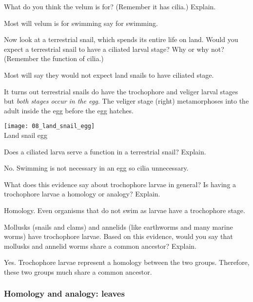 \documentclass[12pt, hidelinks]{exam}
\newcommand*\AnswerBox[2]{%
    \parbox[t][#1]{0.92\textwidth}{%
    \begin{solution}#2\end{solution}}
    \vspace{\stretch{1}}
}
\begin{document}
\begin{questions}
\question
What do you think the velum is for? (Remember it has cilia.) Explain.

\AnswerBox{4\baselineskip}{Most will velum is for swimming say for swimming.}


\question
Now look at a terrestrial snail, which spends its
entire life on land. Would you expect a terrestrial snail to
have a ciliated larval stage? Why or why not? (Remember the
function of cilia.)

\AnswerBox{4\baselineskip}{Most will say they would not expect land snails to have ciliated stage.}

\begin{minipage}{0.75\textwidth}%
It turns out terrestrial snails do have the
trochophore and veliger larval stages but \emph{both stages occur in the egg.} The veliger stage (right)
metamorphoses into the adult inside the egg before the egg hatches. 
\end{minipage}\hfill
\begin{minipage}{0.25\textwidth}%
\centering\texttt{[image: 08\_land\_snail\_egg]}\\
{\footnotesize Land snail egg}
\end{minipage}

\question
Does a ciliated larva serve a function in a terrestrial snail? Explain.

\AnswerBox{4\baselineskip}{No. Swimming is not necessary in an egg so cilia unnecessary.}

\question
What does this evidence say about trochophore larvae in
general? Is having a trochophore larvae a homology or analogy? Explain.

\AnswerBox{4\baselineskip}{Homology. Even organisms that do not swim as larvae have a trochophore stage. }


\question
Mollusks (snails and clams) and annelids (like earthworms and many marine worms) have trochophore larvae. Based on this evidence, would you say that mollusks and annelid worms share a common ancestor? Explain.

\AnswerBox{3\baselineskip}{Yes. Trochophore larvae represent a homology between the two groups. Therefore, these two groups much share a common ancestor. }

\newpage

\subsubsection*{Homology and analogy: leaves}


\end{questions}
\end{document}
